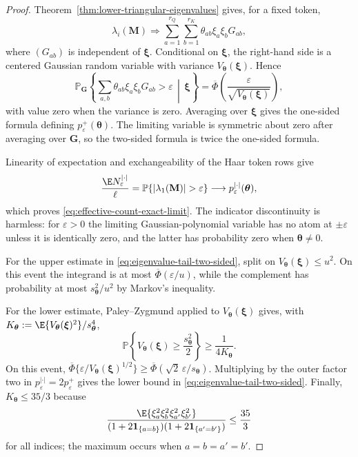 \documentclass{article}
\newcommand{\Prob}{\mathbb{P}}
\newcommand{\weak}{\Rightarrow}
\newcommand{\bM}{\mathbf{M}}
\newcommand{\bG}{\mathbf{G}}
\newcommand{\barPhi}{\overline{\Phi}}
\theoremstyle{definition}
\theoremstyle{remark}
\begin{document}
\begin{proof}
Theorem~\ref{thm:lower-triangular-eigenvalues} gives, for a fixed token,
\[
    \lambda_i(\bM)
    \weak
    \sum_{a=1}^{r_Q}\sum_{b=1}^{r_K}
    \theta_{ab}\xi_a\xi_bG_{ab},
\]
where $(G_{ab})$ is independent of $\boldsymbol{\xi}$.  Conditional on
$\boldsymbol{\xi}$, the right-hand side is a centered Gaussian random variable
with variance $V_{\boldsymbol{\theta}}(\boldsymbol{\xi})$.  Hence
\[
    \Prob_{\bG}
    \left\{
    \sum_{a,b}\theta_{ab}\xi_a\xi_bG_{ab}>\varepsilon
    \,\middle|\,\boldsymbol{\xi}
    \right\}
    =
    \barPhi\left(
        \frac{\varepsilon}{\sqrt{V_{\boldsymbol{\theta}}(\boldsymbol{\xi})}}
    \right),
\]
with value zero when the variance is zero.  Averaging over
$\boldsymbol{\xi}$ gives the one-sided formula defining
$p_\varepsilon^+(\boldsymbol{\theta})$.  The limiting variable is symmetric
about zero after averaging over $\bG$, so the two-sided formula is twice the
one-sided formula.

Linearity of expectation and exchangeability of the Haar token rows give
\[
    \frac{\E N_\varepsilon^{|\cdot|}}{\ell}
    =
    \Prob\{|\lambda_1(\bM)|>\varepsilon\}
    \longrightarrow
    p_\varepsilon^{|\cdot|}(\boldsymbol{\theta}),
\]
which proves \eqref{eq:effective-count-exact-limit}.  The indicator
discontinuity is harmless: for $\varepsilon>0$ the limiting Gaussian-polynomial
variable has no atom at $\pm\varepsilon$ unless it is identically zero, and the
latter has probability zero when $\boldsymbol{\theta}\neq0$.

For the upper estimate in \eqref{eq:eigenvalue-tail-two-sided}, split on
$V_{\boldsymbol{\theta}}(\boldsymbol{\xi})\leq u^2$.  On this event the
integrand is at most $\barPhi(\varepsilon/u)$, while the complement has
probability at most $s_{\boldsymbol{\theta}}^2/u^2$ by Markov's inequality.

For the lower estimate, Paley--Zygmund applied to
$V_{\boldsymbol{\theta}}(\boldsymbol{\xi})$ gives, with
$K_{\boldsymbol{\theta}}:=
\E\{V_{\boldsymbol{\theta}}(\boldsymbol{\xi})^2\}/s_{\boldsymbol{\theta}}^4$,
\[
    \Prob\left\{
    V_{\boldsymbol{\theta}}(\boldsymbol{\xi})
    \geq
    \frac{s_{\boldsymbol{\theta}}^2}{2}
    \right\}
    \geq
    \frac{1}{4K_{\boldsymbol{\theta}}}.
\]
On this event,
$\barPhi\{\varepsilon/V_{\boldsymbol{\theta}}(\boldsymbol{\xi})^{1/2}\}
\geq
\barPhi(\sqrt2\,\varepsilon/s_{\boldsymbol{\theta}})$.  Multiplying by the
outer factor two in $p_\varepsilon^{|\cdot|}=2p_\varepsilon^+$ gives the lower
bound in \eqref{eq:eigenvalue-tail-two-sided}.  Finally,
$K_{\boldsymbol{\theta}}\leq 35/3$ because
\[
    \frac{
    \E\{\xi_a^2\xi_b^2\xi_{a'}^2\xi_{b'}^2\}}
    {(1+2\mathbf 1_{\{a=b\}})(1+2\mathbf 1_{\{a'=b'\}})}
    \leq
    \frac{35}{3}
\]
for all indices; the maximum occurs when $a=b=a'=b'$.


\end{proof}
\end{document}
